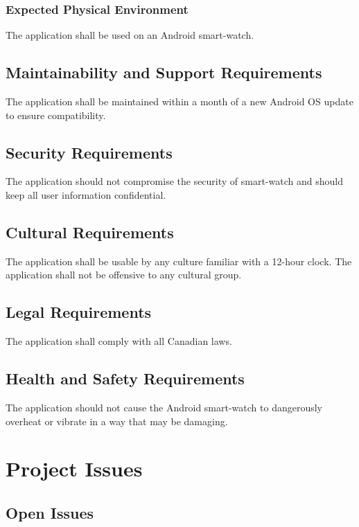 \documentclass[12pt, titlepage]{article}
\begin{document}
\subsubsection{Expected Physical Environment}

The application shall be used on an Android smart-watch.

\subsection{Maintainability and Support Requirements}

The application shall be maintained within a month of a new Android OS update to ensure compatibility.

\subsection{Security Requirements}

The application should not compromise the security of smart-watch and should keep all user information confidential.

\subsection{Cultural Requirements}

The application shall be usable by any culture familiar with a 12-hour clock. The application shall not be offensive to any cultural group.

\subsection{Legal Requirements}

The application shall comply with all Canadian laws.

\subsection{Health and Safety Requirements}

The application should not cause the Android smart-watch to dangerously overheat or vibrate in a way that may be damaging. %

\section{Project Issues}
\subsection{Open Issues}
\end{document}
